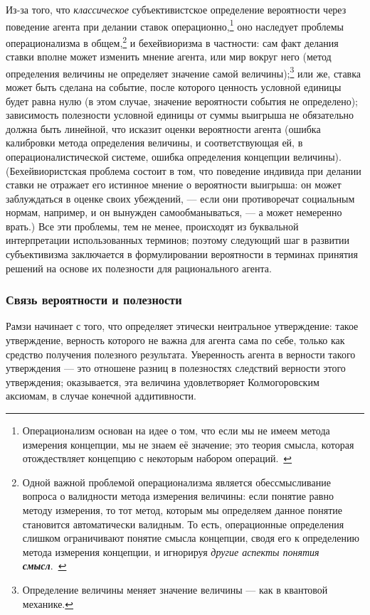\documentclass[14pt, a4paper, pdftex]{extarticle}
\begin{document}
Из-за того, что \emph{классическое} субъективистское определение вероятности через поведение агента при делании ставок операционно,\footnote{
	Операционализм основан на идее о том, что если мы не имеем метода измерения концепции, мы не знаем её значение; это теория смысла, которая отождествляет концепцию с некоторым набором операций.~\cite{Operationalism}
}
оно наследует проблемы операционализма в общем,\footnote{
	Одной важной проблемой операционализма является обессмысливание вопроса о валидности метода измерения величины: если понятие равно методу измерения, то тот метод, которым мы определяем данное понятие становится автоматически валидным. То есть, операционные определения слишком ограничивают понятие смысла концепции, сводя его к определению метода измерения концепции, и игнорируя \emph{другие аспекты понятия \textbf{смысл}}.~\cite{Operationalism}
}
и бехейвиоризма в частности: сам факт делания ставки вполне может изменить мнение агента, или мир вокруг него (метод определения величины не определяет значение самой величины);\footnote{
	Определение величины меняет значение величины --- как в квантовой механике.
} или же, ставка может быть сделана на событие, после которого ценность условной единицы будет равна нулю (в этом случае, значение вероятности события не определено); зависимость полезности условной единицы от суммы выигрыша не обязательно должна быть линейной, что исказит оценки вероятности агента (ошибка калибровки метода определения величины, и соответствующая ей, в операционалистической системе, ошибка определения концепции величины). (Бехейвиористская проблема состоит в том, что поведение индивида при делании ставки не отражает его истинное мнение о вероятности выигрыша: он может заблуждаться в оценке своих убеждений, --- если они противоречат социальным нормам, например, и он вынужден самообманываться, --- а может немеренно врать.) Все эти проблемы, тем не менее, происходят из буквальной интерпретации использованных терминов; поэтому следующий шаг в развитии субъективизма заключается в формулировании вероятности в терминах принятия решений на основе их полезности для рационального агента.

\subsubsection{Связь вероятности и полезности}

Рамзи начинает с того, что определяет этически неитральное утверждение: такое утверждение, верность которого не важна для агента сама по себе, только как средство получения полезного результата. Уверенность агента в верности такого утверждения --- это отношене разниц в полезностях следствий верности этого утверждения; оказывается, эта величина удовлетворяет Колмогоровским аксиомам, в случае конечной аддитивности. 
\end{document}
